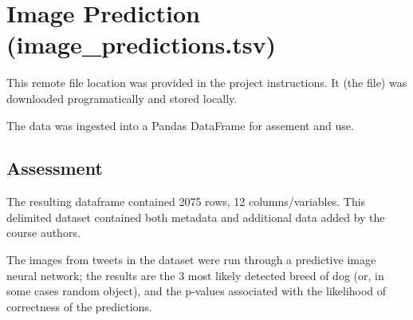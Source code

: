 \documentclass{report}
\begin{document}
\section{Image Prediction (\textbf{image\_predictions.tsv})}

This remote file location was provided in the project instructions.  It (the file) was downloaded programatically and stored locally. 

The data was ingested into a Pandas DataFrame for assement and use.

	\subsection{Assessment}
	The resulting dataframe contained 2075 rows, 12 columns/variables. This delimited dataset contained both metadata and additional data added by the course authors. 

	The images from tweets in the dataset were run through a predictive image neural network; 
	the results are the 3 most likely detected breed of dog (or, in some cases random object), and the p-values associated with the likelihood of correctness of the predictions.
\end{document}
